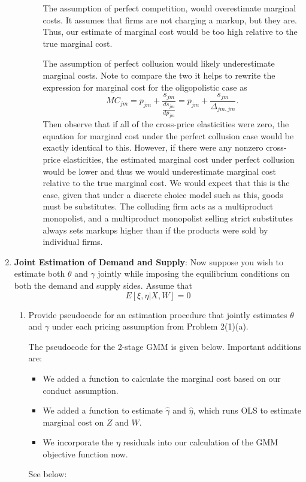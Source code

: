 \documentclass{article}
\begin{document}
\begin{enumerate}
\begin{enumerate}
\begin{enumerate}
        \begin{answer}

            The assumption of perfect competition, would overestimate marginal costs. It assumes that firms are not charging a markup, but they are. Thus, our estimate of marginal cost would be too high relative to the true marginal cost.

            The assumption of perfect collusion would likely underestimate marginal costs. Note to compare the two it helps to rewrite the expression for marginal cost for the oligopolistic case as 
            \[
            MC_{jm} = p_{jm} + \frac{s_{jm}}{\frac{d s_{jm}}{d p_{jm}} } = p_{jm} + \frac{s_{jm}}{\Delta_{jm, jm}}.
            \]
            Then observe that if all of the cross-price elasticities were zero, the equation for marginal cost under the perfect collusion case would be exactly identical to this. However, if there were any nonzero cross-price elasticities, the estimated marginal cost under perfect collusion would be lower and thus we would underestimate marginal cost relative to the true marginal cost. We would expect that this is the case, given that under a discrete choice model such as this, goods must be substitutes. The colluding firm acts as a multiproduct monopolist, and a multiproduct monopolist selling strict substitutes always sets markups higher than if the products were sold by individual firms. 
            
        \end{answer}
       
    \end{enumerate}
\end{enumerate}

\item \textbf{Joint Estimation of Demand and Supply}: Now suppose you wish to estimate
both $\theta$ and $\gamma$ jointly while imposing the equilibrium conditions on both the demand
and supply sides. Assume that
$$E[\xi,\eta|X,W]=0$$
\begin{enumerate}
\item Provide pseudocode for an estimation procedure that jointly estimates $\theta$ and $\gamma$ under
each pricing assumption from Problem 2(1)(a).

\begin{answer}
The pseudocode for the 2-stage GMM is given below. Important additions are: 
\begin{itemize}
    \item We added a function to calculate the marginal cost based on our conduct assumption. 
    \item We added a function to estimate $\hat{\gamma}$ and $\hat{\eta}$, which runs OLS to estimate marginal cost on $Z$ and $W$. 
    \item We incorporate the $\eta$ residuals into our calculation of the GMM objective function now.
\end{itemize}
See below:


\end{answer}
\end{enumerate}
\end{enumerate}
\end{document}
